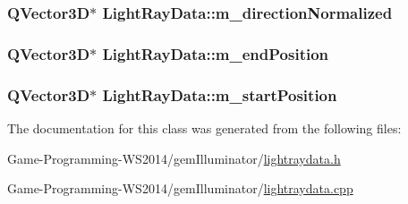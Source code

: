 \subsubsection[{m\+\_\+direction\+Normalized}]{\setlength{\rightskip}{0pt plus 5cm}Q\+Vector3\+D$\ast$ Light\+Ray\+Data\+::m\+\_\+direction\+Normalized\hspace{0.3cm}{\ttfamily [protected]}}\label{class_light_ray_data_af18cf984ba862735dcde2d77767c4bb2}
\hypertarget{class_light_ray_data_ab7228a576b4b1c0843641e3706a6cb35}{}
\subsubsection[{m\+\_\+end\+Position}]{\setlength{\rightskip}{0pt plus 5cm}Q\+Vector3\+D$\ast$ Light\+Ray\+Data\+::m\+\_\+end\+Position\hspace{0.3cm}{\ttfamily [protected]}}\label{class_light_ray_data_ab7228a576b4b1c0843641e3706a6cb35}
\hypertarget{class_light_ray_data_a1da577bdf12b630015fca5d89712e479}{}
\subsubsection[{m\+\_\+start\+Position}]{\setlength{\rightskip}{0pt plus 5cm}Q\+Vector3\+D$\ast$ Light\+Ray\+Data\+::m\+\_\+start\+Position\hspace{0.3cm}{\ttfamily [protected]}}\label{class_light_ray_data_a1da577bdf12b630015fca5d89712e479}


The documentation for this class was generated from the following files\+:\begin{DoxyCompactItemize}
\item 
Game-\/\+Programming-\/\+W\+S2014/gem\+Illuminator/\hyperlink{lightraydata_8h}{lightraydata.\+h}\item 
Game-\/\+Programming-\/\+W\+S2014/gem\+Illuminator/\hyperlink{lightraydata_8cpp}{lightraydata.\+cpp}\end{DoxyCompactItemize}
